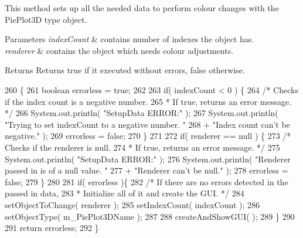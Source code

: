 This method sets up all the needed data to perform colour changes with the Pie\-Plot3\-D type object. 
\begin{DoxyParams}{Parameters}
{\em index\-Count} & contains number of indexes the object has. \\
\hline
{\em renderer} & contains the object which needs colour adjustments. \\
\hline
\end{DoxyParams}
\begin{DoxyReturn}{Returns}
Returns true if it executed without errors, false otherwise. 
\end{DoxyReturn}

\begin{DoxyCode}
260                                                                    \{
261         \textcolor{keywordtype}{boolean} errorless = \textcolor{keyword}{true};
262         
263         \textcolor{keywordflow}{if}( indexCount < 0 ) \{
264             \textcolor{comment}{/* Checks if the index count is a negative number.
}
265 \textcolor{comment}{             * If true, returns an error message. */}
266             System.out.println( \textcolor{stringliteral}{"SetupData ERROR:"} );
267             System.out.println( \textcolor{stringliteral}{"Trying to set indexCount to a negative number. "}
268                                + \textcolor{stringliteral}{"Index count can't be negative."} );
269             errorless = \textcolor{keyword}{false};
270         \}
271         
272         \textcolor{keywordflow}{if}( renderer == null ) \{
273             \textcolor{comment}{/* Checks if the renderer is null.
}
274 \textcolor{comment}{             * If true, returns an error message. */}
275             System.out.println( \textcolor{stringliteral}{"SetupData ERROR:"} );
276             System.out.println( \textcolor{stringliteral}{"Renderer passed in is of a null value. "}
277                                + \textcolor{stringliteral}{"Renderer can't be null."} );
278             errorless = \textcolor{keyword}{false};
279         \}
280         
281         \textcolor{keywordflow}{if}( errorless )\{
282             \textcolor{comment}{/* If there are no errors detected in the passed in data,
}
283 \textcolor{comment}{             * Initialize all of it and create the GUI. */}
284             setObjectToChange( renderer );
285             setIndexCount( indexCount );
286             setObjectType( m\_PiePlot3DName );
287             
288             createAndShowGUI(  );
289         \}
290         
291         \textcolor{keywordflow}{return} errorless;
292     \}
\end{DoxyCode}
